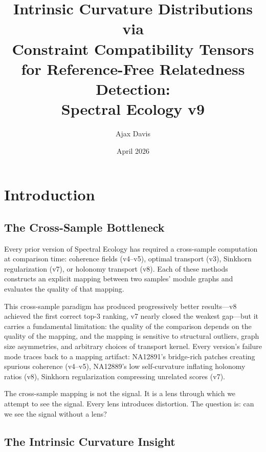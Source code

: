 \documentclass{../yalumba}
\title{Intrinsic Curvature Distributions via\\Constraint Compatibility Tensors\\for Reference-Free Relatedness Detection:\\Spectral Ecology v9}
\author{Ajax Davis}
\date{April 2026}
\begin{document}
\maketitle

\tableofcontents
\newpage


\section{Introduction}
\label{sec:intro}

\subsection{The Cross-Sample Bottleneck}

Every prior version of Spectral Ecology has required a cross-sample
computation at comparison time: coherence fields (v4--v5), optimal transport
(v3), Sinkhorn regularization (v7), or holonomy transport (v8).  Each of
these methods constructs an explicit mapping between two samples' module
graphs and evaluates the quality of that mapping.


This cross-sample paradigm has produced progressively better results---v8
achieved the first correct top-3 ranking, v7 nearly closed the weakest
gap---but it carries a fundamental limitation: the quality of the comparison
depends on the quality of the mapping, and the mapping is sensitive to
structural outliers, graph size asymmetries, and arbitrary choices of
transport kernel.  Every version's failure mode traces back to a mapping
artifact: NA12891's bridge-rich patches creating spurious coherence (v4--v5),
NA12889's low self-curvature inflating holonomy ratios (v8), Sinkhorn
regularization compressing unrelated scores (v7).

\begin{pullquote}
The cross-sample mapping is not the signal.  It is a lens through which we
attempt to see the signal.  Every lens introduces distortion.  The question
is: can we see the signal without a lens?
\end{pullquote}

\subsection{The Intrinsic Curvature Insight}
\end{document}

